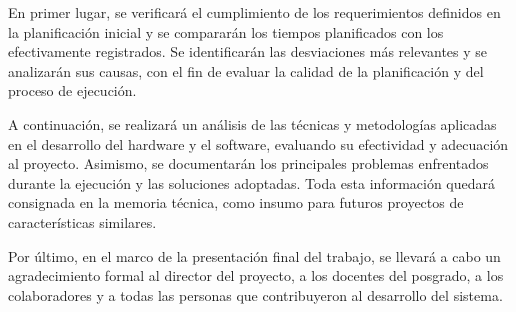 \documentclass[
11pt, %
]{charter}
\begin{document}
En primer lugar, se verificará el cumplimiento de los requerimientos definidos en la planificación inicial y se compararán los tiempos planificados con los efectivamente registrados. Se identificarán las desviaciones más relevantes y se analizarán sus causas, con el fin de evaluar la calidad de la planificación y del proceso de ejecución.

A continuación, se realizará un análisis de las técnicas y metodologías aplicadas en el desarrollo del hardware y el software, evaluando su efectividad y adecuación al proyecto. Asimismo, se documentarán los principales problemas enfrentados durante la ejecución y las soluciones adoptadas. Toda esta información quedará consignada en la memoria técnica, como insumo para futuros proyectos de características similares.

Por último, en el marco de la presentación final del trabajo, se llevará a cabo un agradecimiento formal al director del proyecto, a los docentes del posgrado, a los colaboradores y a todas las personas que contribuyeron al desarrollo del sistema.
\end{document}
